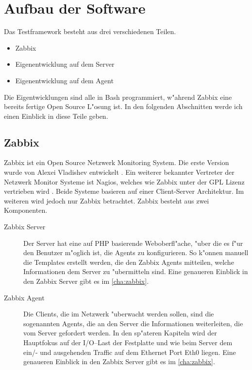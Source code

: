 \section{Aufbau der Software} \label{sec:aufbauSoftware}
Das Testframework besteht aus drei verschiedenen Teilen. %
\begin{itemize}
\item Zabbix %
\item Eigenentwicklung auf dem Server %
\item Eigenentwicklung auf dem Agent %
\end{itemize}
Die Eigentwicklungen sind alle in Bash programmiert, w"ahrend Zabbix eine bereits fertige Open Source L"osung %
ist. In den folgenden Abschnitten werde ich einen Einblick in diese Teile geben. %

\subsection{Zabbix}
Zabbix ist ein Open Source Netzwerk Monitoring System. Die erste Version wurde von \mbox{Alexei} Vladishev entwickelt \autocite{zabbix:Web}. %
Ein weiterer bekannter Vertreter der Netzwerk Monitor Systeme ist Nagios, welches wie Zabbix unter der GPL Lizenz vertrieben wird \autocite{wiki:Nagios}. %
Beide Systeme basieren auf einer Client-Server Architektur. Im weiteren wird jedoch nur Zabbix betrachtet. %
Zabbix besteht aus zwei Komponenten. %

\begin{description}
\item[Zabbix Server]Der Server hat eine auf PHP basierende Weboberfl"ache, "uber die es f"ur den Benutzer m"oglich ist, die Agents zu %
konfigurieren. So k"onnen manuell die Templates erstellt werden, die den Zabbix Agents mitteilen, welche Informationen dem %
Server zu "ubermitteln sind. Eine genaueren Einblick in den Zabbix Server gibt es im \cref{cha:zabbix}. %
\item[Zabbix Agent]Die Clients, die im Netzwerk "uberwacht werden sollen, sind die sogenannten Agents, die an den Server %
die Informationen weiterleiten, die vom Server gefordert werden. In den sp"ateren Kapiteln wird der Hauptfokus auf der %
I/O--Last der Festplatte und wie beim Server dem ein/- und ausgehenden Traffic auf dem Ethernet Port Eth0 liegen. %
Eine genaueren Einblick in den Zabbix Server gibt es im \cref{cha:zabbix}. %
\end{description} 

